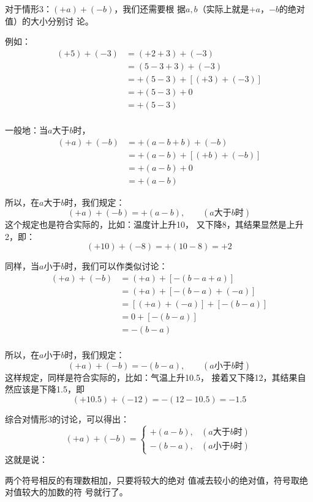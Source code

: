 对于情形3：$(+a)+(-b)$，我们还需要根
据$a,b$（实际上就是$+a$，$-b$的绝对值）的大小分别讨
论。

例如：
\begin{align*}
    (+5)+(-3)&=(+2+3)+(-3)\\
    &=(5-3 + 3)+(-3)\\
    &=+(5-3)+[(+3)+(-3)]\tag{加法结合律}\\
                      &=+(5-3)+0 \tag{相反数的性质}\\
                      &=+(5-3)\tag{零的特性}\\
\end{align*}

一般地：当$a$大于$b$时，
\begin{align*}
    (+ a)+(-b)&=+(a-b + b)+(-b)\\
    &=+(a-b)+[(+b)+(-b)]    \tag{加法结合律}\\
 & =+(a-b) + 0 \tag{零的特性}\\
  &  =+(a-b)
\end{align*}

所以，在$a$大于$b$时，我们规定：
\[(+a)+(-b)=+(a-b),\qquad (\text{$a$大于$b$时})\]
这个规定也是符合实际的，比如：温度计上升10\oc，
又下降8\oc，其结果显然是上升2\oc，即：
     \[     (+10)+(-8)=+(10-8)=+2\]

    同样，当$a$小于$b$时，我们可以作类似讨论：
\begin{align*}
    (+ a)+(-b)&=(+ a)+[-(b-a+a)]\\
   & =(+ a)+[-(b-a)+( -a)]   \tag{情形2加法法则}\\
  &=[(+ a)+(-a)]+[-(b-a) ]  \tag{加法交换、结合律}\\
&=0+[-(b-a)]\tag{相反数的特性}\\
&=-(b-a)\tag{零的特性}\\
\end{align*}

     
    所以，在$a$小于$b$时，我们规定：
    \[(+a)+(-b)=-(b-a),\qquad (\text{$a$小于$b$时})\]
这样规定，同样是符合实际的，比如：气温上升10.5\oc，
接着又下降12\oc，其结果自然应该是下降1.5\oc，即
\[(+10.5)+(-12)=-(12-10.5)=-1.5\]

综合对情形3的讨论，可以得出：
\[(+a)+(-b)=\begin{cases}
    +(a-b),& (\text{$a$大于$b$时})\\
    -(b-a),& (\text{$a$小于$b$时})
\end{cases}\]
这就是说：

    \begin{blk}{}
        两个符号相反的有理数相加，只要将较大的绝对
值减去较小的绝对值，符号取绝对值较大的加数的符
号就行了。
    \end{blk}
    
